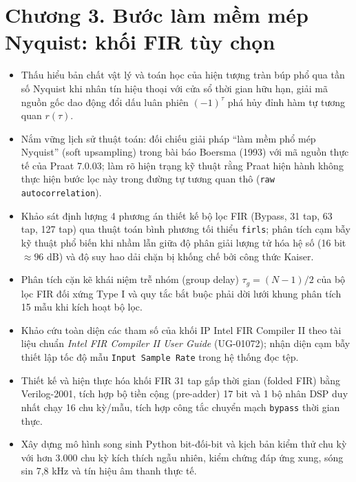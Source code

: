 \providecommand{\todo}[1]{\textcolor{red}{\textbf{[TODO: #1]}}}
\clearpage
{}
\section*{Chương 3. Bước làm mềm mép Nyquist: khối FIR tùy chọn}

\begin{learningobj}
\begin{itemize}[leftmargin=1.5em, itemsep=2pt]
    \item Thấu hiểu bản chất vật lý và toán học của hiện tượng tràn búp phổ qua tần số Nyquist khi nhân tín hiệu thoại với cửa sổ thời gian hữu hạn, giải mã nguồn gốc dao động đổi dấu luân phiên $(-1)^\tau$ phá hủy đỉnh hàm tự tương quan $r(\tau)$.
    \item Nắm vững lịch sử thuật toán: đối chiếu giải pháp ``làm mềm phổ mép Nyquist'' (soft upsampling) trong bài báo Boersma (1993) với mã nguồn thực tế của Praat 7.0.03; làm rõ hiện trạng kỹ thuật rằng Praat hiện hành không thực hiện bước lọc này trong đường tự tương quan thô (\texttt{raw autocorrelation}).
    \item Khảo sát định lượng 4 phương án thiết kế bộ lọc FIR (Bypass, 31 tap, 63 tap, 127 tap) qua thuật toán bình phương tối thiểu \texttt{firls}; phân tích cạm bẫy kỹ thuật phổ biến khi nhầm lẫn giữa độ phân giải lượng tử hóa hệ số (16 bit $\approx 96\text{ dB}$) và độ suy hao dải chặn bị khống chế bởi công thức Kaiser.
    \item Phân tích cặn kẽ khái niệm trễ nhóm (group delay) $\tau_g = (N-1)/2$ của bộ lọc FIR đối xứng Type I và quy tắc bắt buộc phải dời lưới khung phân tích 15 mẫu khi kích hoạt bộ lọc.
    \item Khảo cứu toàn diện các tham số của khối IP Intel FIR Compiler II theo tài liệu chuẩn \emph{Intel FIR Compiler II User Guide} (UG-01072); nhận diện cạm bẫy thiết lập tốc độ mẫu \texttt{Input Sample Rate} trong hệ thống đọc tệp.
    \item Thiết kế và hiện thực hóa khối FIR 31 tap gấp thời gian (folded FIR) bằng Verilog-2001, tích hợp bộ tiền cộng (pre-adder) 17 bit và 1 bộ nhân DSP duy nhất chạy 16 chu kỳ/mẫu, tích hợp công tắc chuyển mạch \texttt{bypass} thời gian thực.
    \item Xây dựng mô hình song sinh Python bit-đối-bit và kịch bản kiểm thử chu kỳ với hơn 3.000 chu kỳ kích thích ngẫu nhiên, kiểm chứng đáp ứng xung, sóng sin 7,8 kHz và tín hiệu âm thanh thực tế.
\end{itemize}
\end{learningobj}

